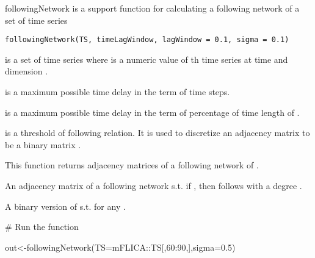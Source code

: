 \documentclass[a4paper]{book}
\begin{document}
%
\begin{Description}\relax
followingNetwork is a support function for calculating a following network of a set of time series
\end{Description}
%
\begin{Usage}
\begin{verbatim}
followingNetwork(TS, timeLagWindow, lagWindow = 0.1, sigma = 0.1)
\end{verbatim}
\end{Usage}
%
\begin{Arguments}
\begin{ldescription}
\item[\code{TS}] is a set of time series where  is a numeric value of th time series at time  and dimension .

\item[\code{timeLagWindow}] is a maximum possible time delay in the term of time steps.

\item[\code{lagWindow}] is a maximum possible time delay in the term of percentage of time length of .

\item[\code{sigma}] is a threshold of following relation. It is used to discretize an adjacency matrix  to be a binary matrix .
\end{ldescription}
\end{Arguments}
%
\begin{Value}
This function returns adjacency matrices of a following network of .

\begin{ldescription}
\item[\code{adjWeightedMat}]  An adjacency matrix of a following network
s.t. if , then  follows   with a degree . 
\item[\code{adjBinMat}]  A binary version of  s.t.  for any .  
\end{ldescription}
\end{Value}
%
\begin{Examples}
\begin{ExampleCode}

# Run the function

out<-followingNetwork(TS=mFLICA::TS[,60:90,],sigma=0.5)

\end{ExampleCode}
\end{Examples}
\end{document}
